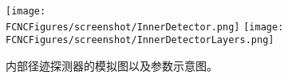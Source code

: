\begin{figure}[H]
\centering
\texttt{[image: \\FCNCFigures/screenshot/InnerDetector.png]}
\texttt{[image: \\FCNCFigures/screenshot/InnerDetectorLayers.png]}
\caption{内部径迹探测器的模拟图以及参数示意图。}
\label{fig:InnerDetector}
\end{figure}